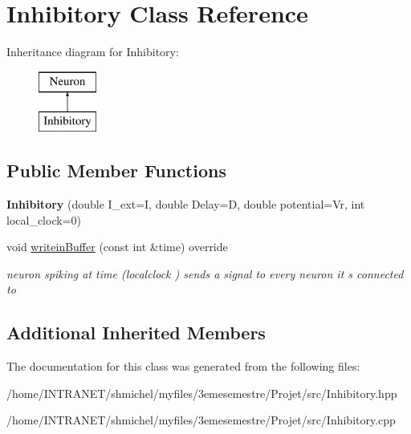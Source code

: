 \hypertarget{classInhibitory}{\section{Inhibitory Class Reference}
\label{classInhibitory}
}
Inheritance diagram for Inhibitory\-:\begin{figure}[H]
\begin{center}
\leavevmode
\includegraphics[height=2.000000cm]{classInhibitory}
\end{center}
\end{figure}
\subsection*{Public Member Functions}
\begin{DoxyCompactItemize}
\item 
\hypertarget{classInhibitory_a68602b4762f76965444a4624db6a5165}{{\bfseries Inhibitory} (double I\-\_\-ext=I, double Delay=D, double potential=Vr, int local\-\_\-clock=0)}\label{classInhibitory_a68602b4762f76965444a4624db6a5165}

\item 
\hypertarget{classInhibitory_a126f7fedd52892995a2017319ee23470}{void \hyperlink{classInhibitory_a126f7fedd52892995a2017319ee23470}{writein\-Buffer} (const int \&time) override}\label{classInhibitory_a126f7fedd52892995a2017319ee23470}

\begin{DoxyCompactList}\small\item\em neuron spiking at time (localclock ) sends a signal to every neuron it s connected to \end{DoxyCompactList}\end{DoxyCompactItemize}
\subsection*{Additional Inherited Members}


The documentation for this class was generated from the following files\-:\begin{DoxyCompactItemize}
\item 
/home/\-I\-N\-T\-R\-A\-N\-E\-T/shmichel/myfiles/3emesemestre/\-Projet/src/Inhibitory.\-hpp\item 
/home/\-I\-N\-T\-R\-A\-N\-E\-T/shmichel/myfiles/3emesemestre/\-Projet/src/Inhibitory.\-cpp\end{DoxyCompactItemize}

